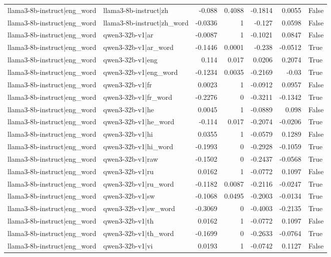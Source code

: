 \begin{table}
\begin{tabular}{l l r r r r l}
llama3-8b-instruct|eng_word & llama3-8b-instruct|zh & -0.088 & 0.4088 & -0.1814 & 0.0055 & False \\
llama3-8b-instruct|eng_word & llama3-8b-instruct|zh_word & -0.0336 & 1 & -0.127 & 0.0598 & False \\
llama3-8b-instruct|eng_word & qwen3-32b-v1|ar & -0.0087 & 1 & -0.1021 & 0.0847 & False \\
llama3-8b-instruct|eng_word & qwen3-32b-v1|ar_word & -0.1446 & 0.0001 & -0.238 & -0.0512 & True \\
llama3-8b-instruct|eng_word & qwen3-32b-v1|eng & 0.114 & 0.017 & 0.0206 & 0.2074 & True \\
llama3-8b-instruct|eng_word & qwen3-32b-v1|eng_word & -0.1234 & 0.0035 & -0.2169 & -0.03 & True \\
llama3-8b-instruct|eng_word & qwen3-32b-v1|fr & 0.0023 & 1 & -0.0912 & 0.0957 & False \\
llama3-8b-instruct|eng_word & qwen3-32b-v1|fr_word & -0.2276 & 0 & -0.3211 & -0.1342 & True \\
llama3-8b-instruct|eng_word & qwen3-32b-v1|he & 0.0045 & 1 & -0.0889 & 0.098 & False \\
llama3-8b-instruct|eng_word & qwen3-32b-v1|he_word & -0.114 & 0.017 & -0.2074 & -0.0206 & True \\
llama3-8b-instruct|eng_word & qwen3-32b-v1|hi & 0.0355 & 1 & -0.0579 & 0.1289 & False \\
llama3-8b-instruct|eng_word & qwen3-32b-v1|hi_word & -0.1993 & 0 & -0.2928 & -0.1059 & True \\
llama3-8b-instruct|eng_word & qwen3-32b-v1|raw & -0.1502 & 0 & -0.2437 & -0.0568 & True \\
llama3-8b-instruct|eng_word & qwen3-32b-v1|ru & 0.0162 & 1 & -0.0772 & 0.1097 & False \\
llama3-8b-instruct|eng_word & qwen3-32b-v1|ru_word & -0.1182 & 0.0087 & -0.2116 & -0.0247 & True \\
llama3-8b-instruct|eng_word & qwen3-32b-v1|sw & -0.1068 & 0.0495 & -0.2003 & -0.0134 & True \\
llama3-8b-instruct|eng_word & qwen3-32b-v1|sw_word & -0.3069 & 0 & -0.4003 & -0.2135 & True \\
llama3-8b-instruct|eng_word & qwen3-32b-v1|th & 0.0162 & 1 & -0.0772 & 0.1097 & False \\
llama3-8b-instruct|eng_word & qwen3-32b-v1|th_word & -0.1699 & 0 & -0.2633 & -0.0764 & True \\
llama3-8b-instruct|eng_word & qwen3-32b-v1|vi & 0.0193 & 1 & -0.0742 & 0.1127 & False \\

\end{tabular}
\end{table}
